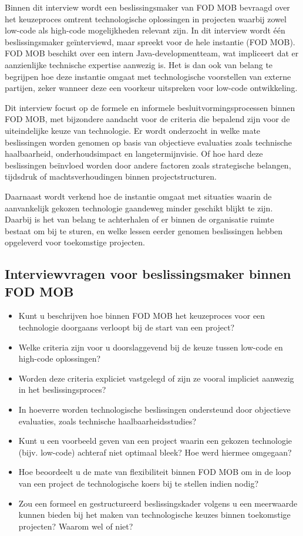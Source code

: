 Binnen dit interview wordt een beslissingsmaker van \gls{FOD MOB} bevraagd over het keuzeproces omtrent technologische oplossingen in projecten waarbij zowel low-code als high-code mogelijkheden relevant zijn. In dit interview wordt één beslissingsmaker geïnterviewd, maar spreekt voor de hele instantie (\gls{FOD MOB}). \gls{FOD MOB} beschikt over een intern Java-developmentteam, wat impliceert dat er aanzienlijke technische expertise aanwezig is. Het is dan ook van belang te begrijpen hoe deze instantie omgaat met technologische voorstellen van externe partijen, zeker wanneer deze een voorkeur uitspreken voor low-code ontwikkeling.

Dit interview focust op de formele en informele besluitvormingsprocessen binnen \gls{FOD MOB}, met bijzondere aandacht voor de criteria die bepalend zijn voor de uiteindelijke keuze van technologie. Er wordt onderzocht in welke mate beslissingen worden genomen op basis van objectieve evaluaties zoals technische haalbaarheid, onderhoudsimpact en langetermijnvisie. Of hoe hard deze beslissingen beïnvloed worden door andere factoren zoals strategische belangen, tijdsdruk of machtsverhoudingen binnen projectstructuren.

Daarnaast wordt verkend hoe de instantie omgaat met situaties waarin de aanvankelijk gekozen technologie gaandeweg minder geschikt blijkt te zijn. Daarbij is het van belang te achterhalen of er binnen de organisatie ruimte bestaat om bij te sturen, en welke lessen eerder genomen beslissingen hebben opgeleverd voor toekomstige projecten.

\subsection{Interviewvragen voor beslissingsmaker binnen \gls{FOD MOB}}
\begin{itemize}
    \item Kunt u beschrijven hoe binnen \gls{FOD MOB} het keuzeproces voor een technologie doorgaans verloopt bij de start van een project?
    \item Welke criteria zijn voor u doorslaggevend bij de keuze tussen low-code en high-code oplossingen?
    \item Worden deze criteria expliciet vastgelegd of zijn ze vooral impliciet aanwezig in het beslissingsproces?
    \item In hoeverre worden technologische beslissingen ondersteund door objectieve evaluaties, zoals technische haalbaarheidsstudies?
    \item Kunt u een voorbeeld geven van een project waarin een gekozen technologie (bijv. low-code) achteraf niet optimaal bleek? Hoe werd hiermee omgegaan?
    \item Hoe beoordeelt u de mate van flexibiliteit binnen \gls{FOD MOB} om in de loop van een project de technologische koers bij te stellen indien nodig?
    \item Zou een formeel en gestructureerd beslissingskader volgens u een meerwaarde kunnen bieden bij het maken van technologische keuzes binnen toekomstige projecten? Waarom wel of niet?
\end{itemize}


